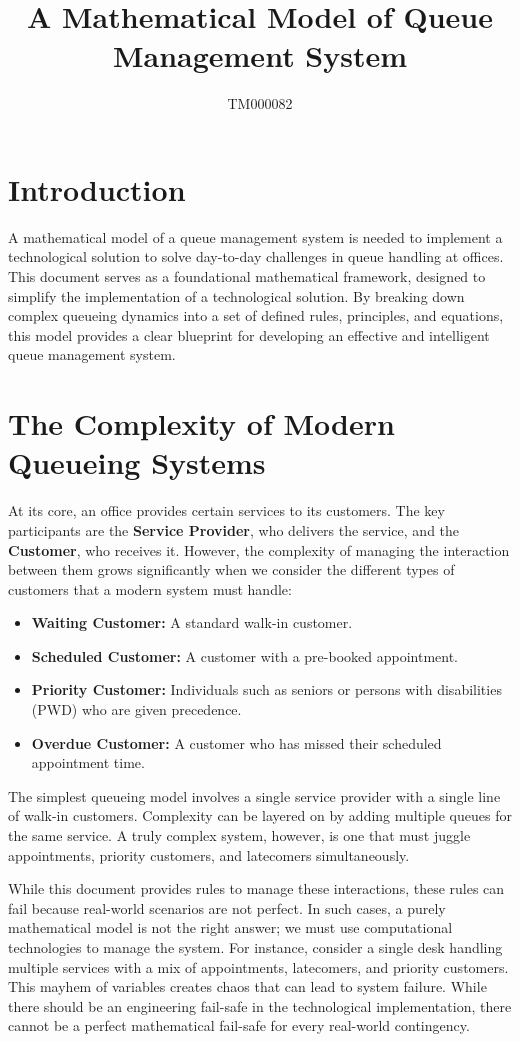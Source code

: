 \documentclass{article}
\title{A Mathematical Model of Queue Management System}
\author{TM000082}
\date{}
\begin{document}
\maketitle

\section{Introduction}

A mathematical model of a queue management system is needed to implement a technological solution to solve day-to-day challenges in queue handling at offices. This document serves as a foundational mathematical framework, designed to simplify the implementation of a technological solution. By breaking down complex queueing dynamics into a set of defined rules, principles, and equations, this model provides a clear blueprint for developing an effective and intelligent queue management system.

\section{The Complexity of Modern Queueing Systems}
At its core, an office provides certain services to its customers. The key participants are the \textbf{Service Provider}, who delivers the service, and the \textbf{Customer}, who receives it. However, the complexity of managing the interaction between them grows significantly when we consider the different types of customers that a modern system must handle:
\begin{itemize}
    \item \textbf{Waiting Customer:} A standard walk-in customer.
    \item \textbf{Scheduled Customer:} A customer with a pre-booked appointment.
    \item \textbf{Priority Customer:} Individuals such as seniors or persons with disabilities (PWD) who are given precedence.
    \item \textbf{Overdue Customer:} A customer who has missed their scheduled appointment time.
\end{itemize}

The simplest queueing model involves a single service provider with a single line of walk-in customers. Complexity can be layered on by adding multiple queues for the same service. A truly complex system, however, is one that must juggle appointments, priority customers, and latecomers simultaneously.

While this document provides rules to manage these interactions, these rules can fail because real-world scenarios are not perfect. In such cases, a purely mathematical model is not the right answer; we must use computational technologies to manage the system. For instance, consider a single desk handling multiple services with a mix of appointments, latecomers, and priority customers. This mayhem of variables creates chaos that can lead to system failure. While there should be an engineering fail-safe in the technological implementation, there cannot be a perfect mathematical fail-safe for every real-world contingency.
\end{document}
